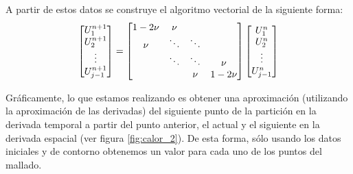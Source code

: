 A partir de estos datos se construye el algoritmo vectorial de la siguiente forma:
\begin{equation*}
	\begin{array}{l l l}
		\begin{bmatrix}
			U_1^{n+1}\\
			U_2^{n+1}\\
			\vdots\\
			U_{j-1}^{n+1}\\
		\end{bmatrix}
		=
		\begin{bmatrix}
			1-2\nu & \nu       &        & \\
			\nu    & \ddots    & \ddots & \\
			          & \ddots & \ddots & \nu\\
			          &        & \nu    & 1-2\nu\\
		\end{bmatrix}
		\begin{bmatrix}
			U_1^{n}\\
			U_2^{n}\\
			\vdots\\
			U_{j-1}^{n}\\
		\end{bmatrix}
	\end{array}
\end{equation*}

Gráficamente, lo que estamos realizando es obtener una aproximación (utilizando la aproximación de las derivadas) del siguiente punto de la partición en la derivada temporal a partir del punto anterior, el actual y el siguiente en la derivada espacial (ver figura \ref{fig:calor_2}). De esta forma, sólo usando los datos iniciales y de contorno obtenemos un valor para cada uno de los puntos del mallado.


